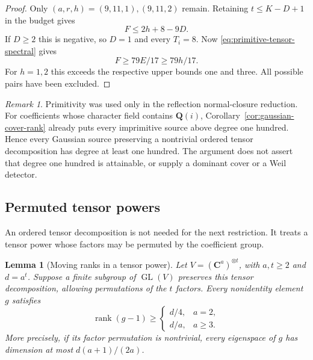\documentclass[11pt]{article}
\newtheorem{lemma}[theorem]{Lemma}
\theoremstyle{definition}
\theoremstyle{remark}
\newtheorem{remark}[theorem]{Remark}
\newcommand{\Q}{\mathbf Q}
\begin{document}
\begin{proof}
Only $(a,r,h)=(9,11,1),(9,11,2)$ remain.
Retaining $t\leq K-D+1$ in the budget gives
\[
                          F\leq2h+8-9D.
\]
If $D\geq2$ this is negative, so $D=1$ and every $T_i=8$.
Now \eqref{eq:primitive-tensor-spectral} gives
\[
                          F\geq79E/17\geq79h/17.
\]
For $h=1,2$ this exceeds the respective upper bounds one
and three. All possible pairs have been excluded.
\end{proof}

\begin{remark}
Primitivity was used only in the reflection normal-closure
reduction. For coefficients whose character field contains
$\Q(i)$, Corollary~\ref{cor:gaussian-cover-rank} already
puts every imprimitive source above degree one hundred.
Hence every Gaussian source preserving a nontrivial ordered
tensor decomposition has degree at least one hundred.
The argument does not assert that degree one hundred is
attainable, or supply a dominant cover or a Weil detector.
\end{remark}

\subsection{Permuted tensor powers}
\label{subsec:permuted-tensor-powers}

An ordered tensor decomposition is not needed for the next
restriction.  It treats a tensor power whose factors may be
permuted by the coefficient group.

\begin{lemma}[Moving ranks in a tensor power]
\label{lem:permuted-tensor-moving-rank}
Let $V=(\mathbf C^a)^{\otimes t}$, with $a,t\geq2$ and
$d=a^t$.  Suppose a finite subgroup of $\operatorname{GL}(V)$
preserves this tensor decomposition, allowing permutations of the
$t$ factors.  Every nonidentity element $g$ satisfies
\[
 \operatorname{rank}(g-1)\geq
 \begin{cases}
 d/4,&a=2,\\
 d/a,&a\geq3.
 \end{cases}
\]
More precisely, if its factor permutation is nontrivial, every
eigenspace of $g$ has dimension at most $d(a+1)/(2a)$.
\end{lemma}
\end{document}
